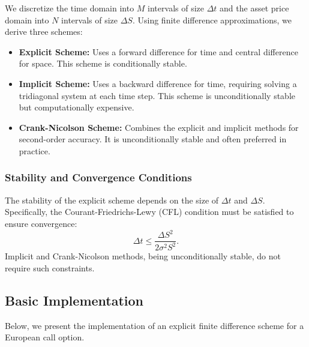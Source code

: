 \documentclass[12pt,a4paper]{report}
\begin{document}
We discretize the time domain into \( M \) intervals of size \( \Delta t \) and the asset price domain into \( N \) intervals of size \( \Delta S \). Using finite difference approximations, we derive three schemes:

\begin{itemize}
    \item \textbf{Explicit Scheme:} Uses a forward difference for time and central difference for space. This scheme is conditionally stable.
    \item \textbf{Implicit Scheme:} Uses a backward difference for time, requiring solving a tridiagonal system at each time step. This scheme is unconditionally stable but computationally expensive.
    \item \textbf{Crank-Nicolson Scheme:} Combines the explicit and implicit methods for second-order accuracy. It is unconditionally stable and often preferred in practice.
\end{itemize}

\subsubsection{Stability and Convergence Conditions}
The stability of the explicit scheme depends on the size of \( \Delta t \) and \( \Delta S \). Specifically, the Courant-Friedrichs-Lewy (CFL) condition must be satisfied to ensure convergence:
\[
\Delta t \leq \frac{\Delta S^2}{2 \sigma^2 S^2}.
\]
Implicit and Crank-Nicolson methods, being unconditionally stable, do not require such constraints.

\subsection{Basic Implementation}
Below, we present the implementation of an explicit finite difference scheme for a European call option. 
\end{document}
